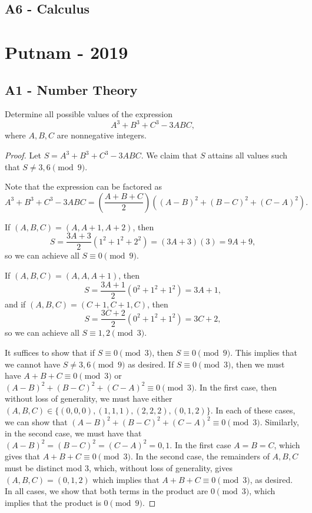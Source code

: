 \documentclass[11pt]{scrartcl}
\begin{document}
\subsection{A6 - Calculus}
\begin{Prob}[2001 - A6]
\end{Prob}
\pagebreak
\section{Putnam - 2019}
\subsection{A1 - Number Theory}
\begin{Prob}[2019 - A1] Determine all possible values of the expression $$A^3 + B^3 + C^3 - 3ABC,$$
where $A, B, C$ are nonnegative integers.
\end{Prob}
\begin{proof}
Let $S = A^3 + B^3 + C^3 - 3ABC$.  We claim that $S$ attains all values such that $S \ne 3, 6 \pmod{9}$.

Note that the expression can be factored as 
$$A^3 + B^3 + C^3 - 3ABC = \left (\frac{A + B + C}{2}\right)\left((A-B)^2 + (B-C)^2 + (C-A)^2\right).$$

If $(A, B, C) = (A, A+1, A+2)$, then 
$$S = \frac{3A+3}{2}(1^2 + 1^2 + 2^2) = (3A + 3)(3) = 9A + 9,$$
so we can achieve all $S \equiv 0 \pmod 9.$

If $(A, B, C) = (A, A, A+1)$, then
$$S = \frac{3A+1}{2}(0^2+1^2+1^2) = 3A+1,$$
and if $(A, B, C) = (C+1, C+1, C)$, then 
$$S = \frac{3C+2}{2}(0^2+1^2+1^2) = 3C+2,$$
so we can achieve all $S \equiv 1, 2 \pmod{3}$.  

It suffices to show that if $S \equiv 0 \pmod{3}$, then $S \equiv 0 \pmod{9}$.  This implies that we cannot have $S \ne 3, 6 \pmod{9}$ as desired.  If $S \equiv 0 \pmod{3}$, then we must have $A+B+C \equiv 0 \pmod 3$ or $(A-B)^2 + (B-C)^2 + (C-A)^2 \equiv 0 \pmod 3$.  In the first case, then without loss of generality, we must have either $(A, B, C) \in \{(0, 0, 0), (1, 1, 1),( 2, 2, 2), (0, 1, 2)\}$.  In each of these cases, we can show that $(A-B)^2 + (B-C)^2 + (C-A)^2 \equiv 0 \pmod 3$.  Similarly, in the second case, we must have that $(A-B)^2 = (B-C)^2 = (C-A)^2 = 0, 1$.  In the first case $A = B = C$, which gives that $A+B+C \equiv 0 \pmod{3}$.  In the second case, the remainders of $A, B, C$ must be distinct mod $3$, which, without loss of generality, gives $(A, B, C) = (0, 1, 2)$ which implies that $A+B+C \equiv 0 \pmod{3}$, as desired.  In all cases, we show that both terms in the product are $0 \pmod {3}$, which implies that the product is $0 \pmod {9}$.
\end{proof}
\end{document}
